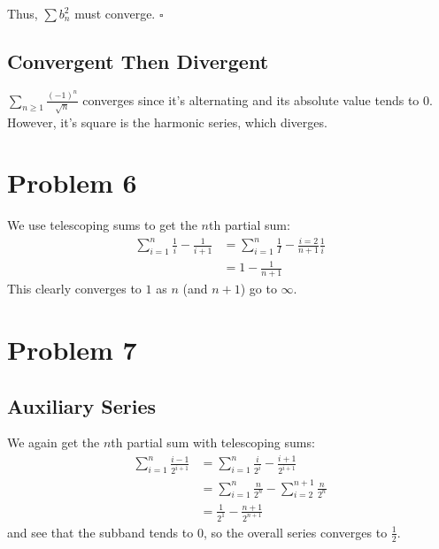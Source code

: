 \documentclass[12pt]{article}
\begin{document}
Thus, $\sum b_n^2$ must converge. $\square$

\subsection{Convergent Then Divergent}

$\sum_{n \ge 1} \frac{(-1)^n}{\sqrt{n}}$ converges since it's
alternating and its absolute value tends to $0$.
However, it's square is the harmonic series, which diverges.

\section{Problem 6}

We use telescoping sums to get the $n$th partial sum:
\begin{align*}
  \sum_{i=1}^{n} \frac{1}{i}-\frac{1}{i+1}
   & = \sum_{i=1}^{n} \frac{1}{I} - \frac{i=2}{n+1} \frac{1}{i} \\
   & = 1-\frac{1}{n+1}
\end{align*}
This clearly converges to $\boxed{1}$ as $n$ (and $n+1$) go to $\infty$.

\section{Problem 7}

\subsection{Auxiliary Series}


We again get the $n$th partial sum with telescoping sums:
\begin{align*}
  \sum_{i=1}^{n} \frac{i-1}{2^{i+1}}
   & = \sum_{i=1}^{n} \frac{i}{2^i} - \frac{i+1}{2^{i+1}}            \\
   & = \sum_{i=1}^{n} \frac{n}{2^n} - \sum_{i=2}^{n+1} \frac{n}{2^n} \\
   & = \frac{1}{2^1}-\frac{n+1}{2^{n+1}}
\end{align*}
and see that the subband tends to $0$, so the overall series converges to $\boxed{\frac{1}{2}}$.
\end{document}
